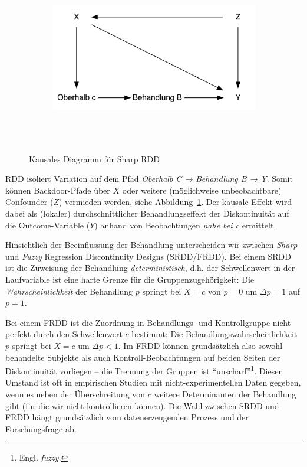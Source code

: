 \documentclass[
  a4paper,
  DIV=11,
  oneside]{scrreprt}
\begin{document}
\begin{figure}

{\centering 

\begin{figure}[H]

{\centering \includegraphics[width=5in,height=3in]{RDD_files/figure-latex/dot-figure-1.png}

}

\end{figure}

}

\caption{\label{fig-CDRDD}Kausales Diagramm für Sharp RDD}

\end{figure}

RDD isoliert Variation auf dem Pfad \emph{Oberhalb C → Behandlung B →
Y}. Somit können Backdoor-Pfade über \(X\) oder weitere (möglichweise
unbeobachtbare) Confounder (\(Z\)) vermieden werden, siehe
Abbildung~\ref{fig-CDRDD}. Der kausale Effekt wird dabei als (lokaler)
durchschnittlicher Behandlungseffekt der Diskontinuität auf die
Outcome-Variable (\(Y\)) anhand von Beobachtungen \emph{nahe bei c}
ermittelt.

Hinsichtlich der Beeinflussung der Behandlung unterscheiden wir zwischen
\emph{Sharp} und \emph{Fuzzy} Regression Discontinuity Designs
(SRDD/FRDD). Bei einem SRDD ist die Zuweisung der Behandlung
\emph{deterministisch}, d.h. der Schwellenwert in der Laufvariable ist
eine harte Grenze für die Gruppenzugehörigkeit: Die
\emph{Wahrscheinlichkeit} der Behandlung \(p\) springt bei \(X=c\) von
\(p=0\) um \(\Delta p = 1\) auf \(p=1\).

Bei einem FRDD ist die Zuordnung in Behandlungs- und Kontrollgruppe
nicht perfekt durch den Schwellenwert \(c\) bestimmt: Die
Behandlungswahrscheinlichkeit \(p\) springt bei \(X=c\) um
\(\Delta p<1\). Im FRDD können grundsätzlich also sowohl behandelte
Subjekte als auch Kontroll-Beobachtungen auf beiden Seiten der
Diskontinuität vorliegen -- die Trennung der Gruppen ist
``unscharf''\footnote{Engl. \emph{fuzzy}.}. Dieser Umstand ist oft in
empirischen Studien mit nicht-experimentellen Daten gegeben, wenn es
neben der Überschreitung von \(c\) weitere Determinanten der Behandlung
gibt (für die wir nicht kontrollieren können). Die Wahl zwischen SRDD
und FRDD hängt grundsätzlich vom datenerzeugenden Prozess und der
Forschungsfrage ab.
\end{document}
